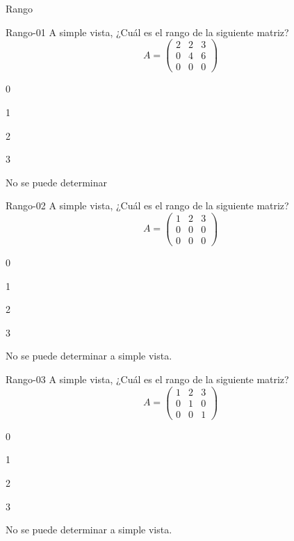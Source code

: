 \documentclass[a4,11pt]{aleph-notas}
\begin{document}
\begin{quiz}{Rango}
    
\begin{multi}[]%
    {Rango-01}
    A simple vista, ¿Cuál es el rango de la siguiente matriz?
    \[
        A=\begin{pmatrix} 2 & 2 & 3 \\ 0 & 4 & 6 \\ 0 & 0 & 0 \end{pmatrix}
    \]
    \item 0
    \item 1
    \item* 2
    \item 3
    \item No se puede determinar
\end{multi}

\begin{multi}[]%
    {Rango-02}
    A simple vista, ¿Cuál es el rango de la siguiente matriz?
    \[
        A=\begin{pmatrix} 1 & 2 & 3 \\ 0 & 0 & 0 \\ 0 & 0 & 0 \end{pmatrix}
    \]
    \item 0
    \item* 1
    \item 2
    \item 3
    \item No se puede determinar a simple vista.
\end{multi}

\begin{multi}[]%
    {Rango-03}
    A simple vista, ¿Cuál es el rango de la siguiente matriz?
    \[
        A=\begin{pmatrix} 1 & 2 & 3 \\ 0 & 1 & 0 \\ 0 & 0 & 1 \end{pmatrix}
    \]
    \item 0
    \item 1
    \item 2
    \item* 3
    \item No se puede determinar a simple vista.
\end{multi}


\end{quiz}
\end{document}
